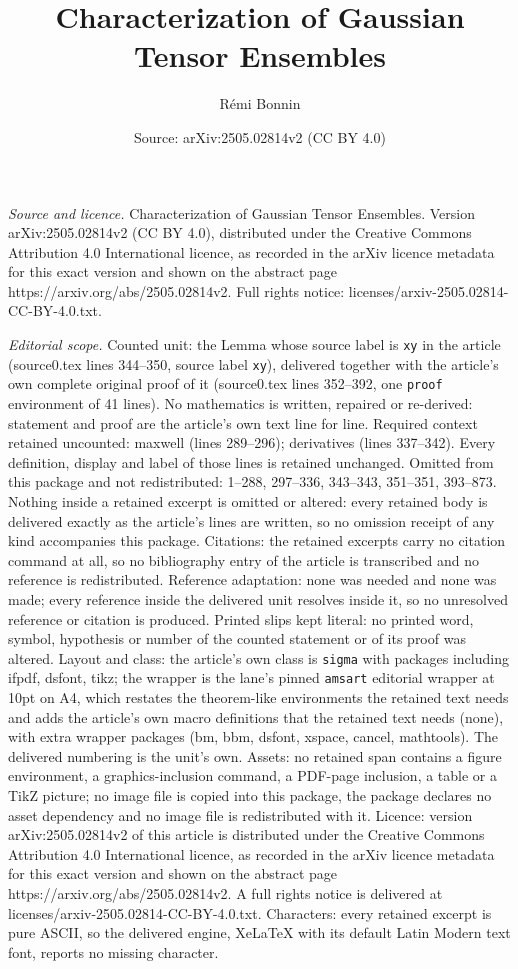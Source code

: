 \documentclass[10pt,a4paper]{amsart}
\title[Characterization of Gaussian Tensor Ensembles]{Characterization of Gaussian Tensor Ensembles}
\author{R\'emi Bonnin}
\date{Source: arXiv:2505.02814v2 (CC BY 4.0)}
\begin{document}
\maketitle

\noindent\emph{Source and licence.} Characterization of Gaussian Tensor Ensembles. Version arXiv:2505.02814v2 (CC BY 4.0), distributed under the Creative Commons Attribution 4.0 International licence, as recorded in the arXiv licence metadata for this exact version and shown on the abstract page https://arxiv.org/abs/2505.02814v2. Full rights notice: licenses/arxiv-2505.02814-CC-BY-4.0.txt.\par\smallskip

\noindent\textit{Editorial scope.} Counted unit: the Lemma whose source label is \texttt{xy} in the article (source0.tex lines 344--350, source label \texttt{xy}), delivered together with the article's own complete original proof of it (source0.tex lines 352--392, one \texttt{proof} environment of 41 lines). No mathematics is written, repaired or re-derived: statement and proof are the article's own text line for line. Required context retained uncounted: maxwell (lines 289--296); derivatives (lines 337--342). Every definition, display and label of those lines is retained unchanged. Omitted from this package and not redistributed: 1--288, 297--336, 343--343, 351--351, 393--873. Nothing inside a retained excerpt is omitted or altered: every retained body is delivered exactly as the article's lines are written, so no omission receipt of any kind accompanies this package. Citations: the retained excerpts carry no citation command at all, so no bibliography entry of the article is transcribed and no reference is redistributed. Reference adaptation: none was needed and none was made; every reference inside the delivered unit resolves inside it, so no unresolved reference or citation is produced. Printed slips kept literal: no printed word, symbol, hypothesis or number of the counted statement or of its proof was altered. Layout and class: the article's own class is \texttt{sigma} with packages including ifpdf, dsfont, tikz; the wrapper is the lane's pinned \texttt{amsart} editorial wrapper at 10pt on A4, which restates the theorem-like environments the retained text needs and adds the article's own macro definitions that the retained text needs (none), with extra wrapper packages (bm, bbm, dsfont, xspace, cancel, mathtools). The delivered numbering is the unit's own. Assets: no retained span contains a figure environment, a graphics-inclusion command, a PDF-page inclusion, a table or a TikZ picture; no image file is copied into this package, the package declares no asset dependency and no image file is redistributed with it. Licence: version arXiv:2505.02814v2 of this article is distributed under the Creative Commons Attribution 4.0 International licence, as recorded in the arXiv licence metadata for this exact version and shown on the abstract page https://arxiv.org/abs/2505.02814v2. A full rights notice is delivered at licenses/arxiv-2505.02814-CC-BY-4.0.txt. Characters: every retained excerpt is pure ASCII, so the delivered engine, XeLaTeX with its default Latin Modern text font, reports no missing character.
\end{document}
